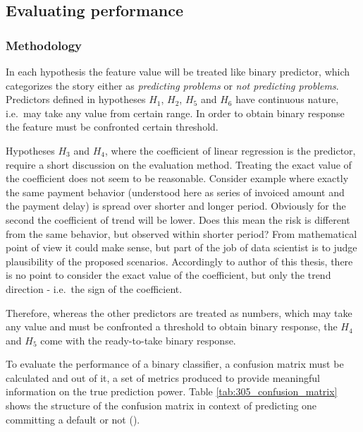 \documentclass{article}
\begin{document}
\subsection{Evaluating performance}

\subsubsection{Methodology}

In each hypothesis the feature value will be treated like binary predictor,
which categorizes the story either as \textit{predicting problems} or \textit{not predicting problems}.
Predictors defined in hypotheses $H_1$, $H_2$, $H_5$ and $H_6$ have continuous nature, i.e.\ may take any value from certain range.
In order to obtain binary response the feature must be confronted certain threshold.
\par Hypotheses $H_3$ and $H_4$, where the coefficient of linear regression is the predictor, require a short discussion on the evaluation method.
Treating the exact value of the coefficient does not seem to be reasonable.
Consider example where exactly the same payment behavior (understood here as series of invoiced amount and the payment delay) is spread over shorter and longer period.
Obviously for the second the coefficient of trend will be lower.
Does this mean the risk is different from the same behavior, but observed within shorter period?
From mathematical point of view it could make sense, but part of the job of data scientist is to judge plausibility of the proposed scenarios.
Accordingly to author of this thesis, there is no point to consider the exact value of the coefficient, but only the trend direction - i.e.\ the sign of the coefficient.
\par Therefore, whereas the other predictors are treated as numbers, which may take any value and must be confronted a threshold to obtain binary response,
the $H_4$ and $H_5$ come with the ready-to-take binary response.
\par To evaluate the performance of a binary classifier, a confusion matrix must be calculated and
out of it, a set of metrics produced to provide meaningful information on the true prediction power.
Table \ref {tab:305_confusion_matrix} shows the structure of the confusion matrix in context of predicting one committing a default or not (\cite{wiki-cm}).
\end{document}
